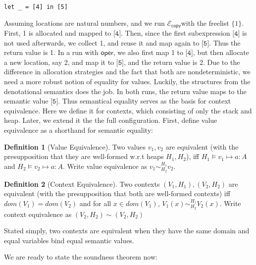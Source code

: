 \documentclass{easychair}
\newcommand{\ms}[1]{\ensuremath{\mathsf{#1}}}
\newcommand{\veq}[4]{#3 \sim^{#1}_{#2} #4}
\newcommand{\ctxeq}[2]{(#1) \sim (#2)}
\newcommand{\copySem}{\ensuremath{\mathcal{E}_{\ms{copy}}}}
\theoremstyle{definition}
\newtheorem{definition}{Definition}
\begin{document}
\begin{verbatim}
let _ = [4] in [5]
\end{verbatim}

Assuming locations are natural numbers, and we run \copySem with the freelist $\{1\}$. 
First, 1 is allocated and mapped to $\texttt{[4]}$. 
Then, since the first subexpression $\texttt{[4]}$ is not used afterwards, we collect 1, and reuse it
and map again to $\texttt{[5]}$. Thus the return value is 1.  In a run with $\ms{oper}$, 
we also first map 1 to $\texttt{[4]}$, but then 
allocate a new location, say 2, and map it to $\texttt{[5]}$, and the return value is 2. Due to the 
difference in allocation strategies and the fact that both are nondeterministic, we need a more 
robust notion of equality for values. Luckily, the structures from the denotational semantics 
does the job. In both runs, the return value maps to the semantic value $\texttt{[5]}$.
Thus semantical equality serves as the basis for context equivalence. 
Here we define it for contexts, which consisting of only the stack and heap. 
Later, we extend it the the full configuration. First, define value equivalence as
a shorthand for semantic equality: 

\begin{definition}[Value Equivalence]
Two values $v_1,v_2$ are equivalent (with the presupposition that they are well-formed w.r.t heaps $H_1,H_2$),
iff $H_1 \vDash v_1 \mapsto a : A$ and $H_2 \vDash v_2 \mapsto a : A$. 
Write value equivalence as $\veq{H_1}{H_2}{v_1}{v_2}$.
\end{definition}

\begin{definition}[Context Equivalence]
Two contexts $(V_1,H_1), (V_2,H_2)$ are equivalent
(with the presupposition that both are well-formed contexts) iff $dom(V_1) = dom(V_2)$ and 
for all $x \in dom(V_1)$, $\veq{H_1}{H_2}{V_1(x)}{V_2(x)}$. Write context equivalence as 
$\ctxeq{V_2,H_2}{V_2,H_2}$
\end{definition}

Stated simply, two contexts are equivalent when they have the same domain and equal variables bind 
equal semantic values. 


We are ready to state the soundness theorem now:
\end{document}
